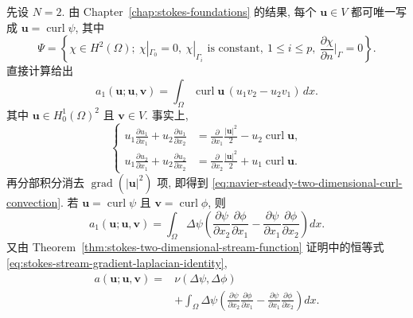 先设 $N=2$. 由 Chapter~\ref{chap:stokes-foundations} 的结果, 每个
$\mathbf u\in V$ 都可唯一写成 $\mathbf u=\operatorname{curl}\psi$, 其中
\[
\Psi=\left\{\chi\in H^2(\Omega);
\ \chi|_{\Gamma_0}=0,
\ \chi|_{\Gamma_i}\text{ is constant},\ 1\leq i\leq p,
\ \frac{\partial\chi}{\partial n}\bigg|_\Gamma=0\right\}.
\]
直接计算给出
\begin{equation}\label{eq:navier-steady-two-dimensional-curl-convection}
a_1(\mathbf u;\mathbf u,\mathbf v)
=\int_\Omega\operatorname{curl}\mathbf u\,(u_1v_2-u_2v_1)\,dx.
\end{equation}
其中 $\mathbf u\in H_0^1(\Omega)^2$ 且 $\mathbf v\in V$.
事实上,
\begin{equation}\label{eq:navier-steady-two-dimensional-component-identities}
\left\{
\begin{aligned}
u_1\frac{\partial u_1}{\partial x_1}
+u_2\frac{\partial u_1}{\partial x_2}
&=\frac{\partial}{\partial x_1}\frac{|\mathbf u|^2}{2}
-u_2\operatorname{curl}\mathbf u,\\
u_1\frac{\partial u_2}{\partial x_1}
+u_2\frac{\partial u_2}{\partial x_2}
&=\frac{\partial}{\partial x_2}\frac{|\mathbf u|^2}{2}
+u_1\operatorname{curl}\mathbf u.
\end{aligned}
\right.
\end{equation}
再分部积分消去 $\operatorname{grad}(|\mathbf u|^2)$ 项, 即得到
\eqref{eq:navier-steady-two-dimensional-curl-convection}.
若 $\mathbf u=\operatorname{curl}\psi$ 且
$\mathbf v=\operatorname{curl}\phi$, 则
\begin{equation}\label{eq:navier-steady-two-dimensional-stream-convection}
a_1(\mathbf u;\mathbf u,\mathbf v)
=\int_\Omega\Delta\psi
\left(
\frac{\partial\psi}{\partial x_2}
\frac{\partial\phi}{\partial x_1}
-\frac{\partial\psi}{\partial x_1}
\frac{\partial\phi}{\partial x_2}
\right)dx.
\end{equation}
又由 Theorem~\ref{thm:stokes-two-dimensional-stream-function} 证明中的恒等式
\eqref{eq:stokes-stream-gradient-laplacian-identity},
\begin{equation}\label{eq:navier-steady-two-dimensional-stream-form}
\begin{aligned}
a(\mathbf u;\mathbf u,\mathbf v)
={}&\nu(\Delta\psi,\Delta\phi)\\
&+\int_\Omega\Delta\psi
\left(
\frac{\partial\psi}{\partial x_2}
\frac{\partial\phi}{\partial x_1}
-\frac{\partial\psi}{\partial x_1}
\frac{\partial\phi}{\partial x_2}
\right)dx.
\end{aligned}
\end{equation}

